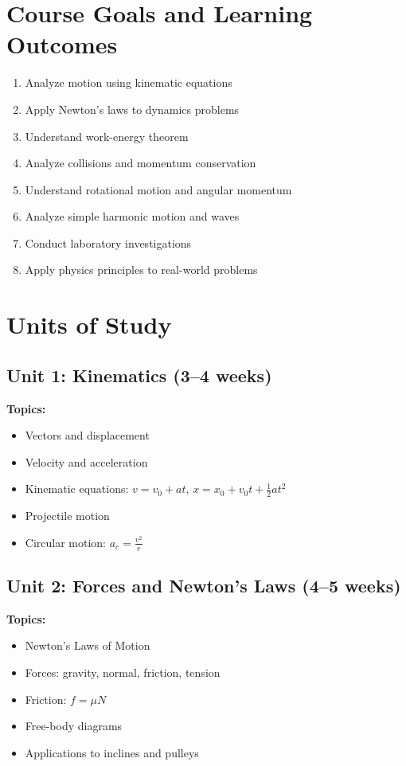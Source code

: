 \documentclass[12pt,oneside]{book}
\begin{document}
\section{Course Goals and Learning Outcomes}

\begin{enumerate}
    \item Analyze motion using kinematic equations
    \item Apply Newton's laws to dynamics problems
    \item Understand work-energy theorem
    \item Analyze collisions and momentum conservation
    \item Understand rotational motion and angular momentum
    \item Analyze simple harmonic motion and waves
    \item Conduct laboratory investigations
    \item Apply physics principles to real-world problems
\end{enumerate}

\section{Units of Study}

\subsection{Unit 1: Kinematics (3--4 weeks)}

\textbf{Topics:}
\begin{itemize}
    \item Vectors and displacement
    \item Velocity and acceleration
    \item Kinematic equations: $v = v_0 + at$, $x = x_0 + v_0t + \frac{1}{2}at^2$
    \item Projectile motion
    \item Circular motion: $a_c = \frac{v^2}{r}$
\end{itemize}

\subsection{Unit 2: Forces and Newton's Laws (4--5 weeks)}

\textbf{Topics:}
\begin{itemize}
    \item Newton's Laws of Motion
    \item Forces: gravity, normal, friction, tension
    \item Friction: $f = \mu N$
    \item Free-body diagrams
    \item Applications to inclines and pulleys
\end{itemize}
\end{document}
